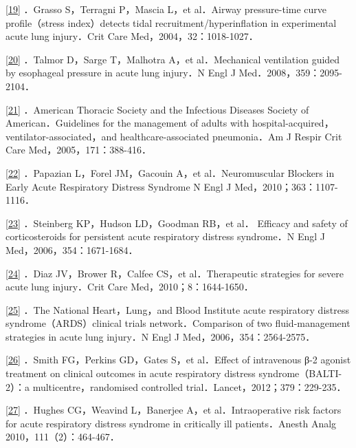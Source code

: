 \protect\hyperlink{text00011.htmlux5cux23ch19-10-back}{{[}19{]}}
．Grasso S，Terragni P，Mascia L，et al．Airway pressure-time curve
profile（stress index）detects tidal recruitment/hyperinflation in
experimental acute lung injury．Crit Care Med，2004，32：1018-1027．

\protect\hyperlink{text00011.htmlux5cux23ch20-10-back}{{[}20{]}}
．Talmor D，Sarge T，Malhotra A，et al．Mechanical ventilation guided by
esophageal pressure in acute lung injury．N Engl J
Med．2008，359：2095-2104．

\protect\hyperlink{text00011.htmlux5cux23ch21-10-back}{{[}21{]}}
．American Thoracic Society and the Infectious Diseases Society of
American．Guidelines for the management of adults with
hospital-acquired，ventilator-associated，and healthcare-associated
pneumonia．Am J Respir Crit Care Med，2005，171：388-416．

\protect\hyperlink{text00011.htmlux5cux23ch22-10-back}{{[}22{]}}
．Papazian L，Forel JM，Gacouin A，et al．Neuromuscular Blockers in
Early Acute Respiratory Distress Syndrome N Engl J
Med，2010；363：1107-1116．

\protect\hyperlink{text00011.htmlux5cux23ch23-10-back}{{[}23{]}}
．Steinberg KP，Hudson LD，Goodman RB，et al． Efficacy and safety of
corticosteroids for persistent acute respiratory distress syndrome．N
Engl J Med，2006，354：1671-1684．

\protect\hyperlink{text00011.htmlux5cux23ch24-10-back}{{[}24{]}} ．Diaz
JV，Brower R，Calfee CS，et al．Therapeutic strategies for severe acute
lung injury．Crit Care Med，2010；8：1644-1650．

\protect\hyperlink{text00011.htmlux5cux23ch25-10-back}{{[}25{]}} ．The
National Heart，Lung，and Blood Institute acute respiratory distress
syndrome（ARDS）clinical trials network．Comparison of two
fluid-management strategies in acute lung injury．N Engl J
Med，2006，354：2564-2575．

\protect\hyperlink{text00011.htmlux5cux23ch26-10-back}{{[}26{]}} ．Smith
FG，Perkins GD，Gates S，et al．Effect of intravenous β-2 agonist
treatment on clinical outcomes in acute respiratory distress
syndrome（BALTI-2）：a multicentre，randomised controlled
trial．Lancet，2012；379：229-235．

\protect\hyperlink{text00011.htmlux5cux23ch27-10-back}{{[}27{]}}
．Hughes CG，Weavind L，Banerjee A，et al．Intraoperative risk factors
for acute respiratory distress syndrome in critically ill
patients．Anesth Analg 2010，111（2）：464-467．

